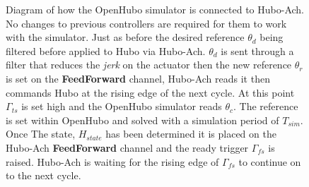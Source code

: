 \begin{figure}
\begin{tikzpicture}[->,>=stealth',shorten >=1pt,auto,node distance=5cm,
  thick,main node/.style={fill=white!20,draw,font=\sffamily\Large\bfseries}]
\end{tikzpicture}
\caption{Diagram of how the OpenHubo simulator is connected to Hubo-Ach.  No changes to previous controllers are required for them to work with the simulator.  Just as before the desired reference $\theta_d$ being filtered before applied to Hubo via Hubo-Ach.  $\theta_d$ is sent through a filter that reduces the \textit{jerk} on the actuator then the new reference $\theta_r$ is set on the \textbf{FeedForward} channel, Hubo-Ach reads it then commands Hubo at the rising edge of the next cycle.  At this point $\Gamma_{ts}$ is set high and the OpenHubo simulator reads $\theta_c$.  The reference is set within OpenHubo and solved with a simulation period of $T_{sim}$.  Once The state, $H_{state}$ has been determined it is placed on the Hubo-Ach \textbf{FeedForward} channel and the ready trigger $\Gamma_{fs}$ is raised.  Hubo-Ach is waiting for the rising edge of $\Gamma_{fs}$ to continue on to the next cycle.}
\label{fig:openhubosim}
\end{figure}

